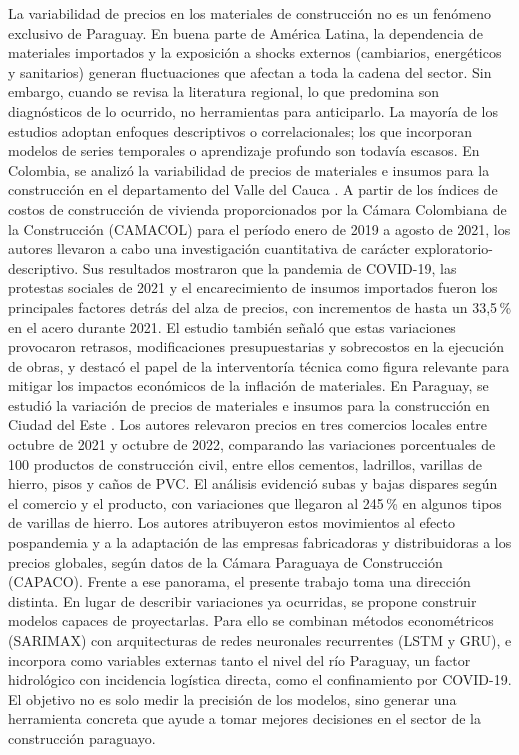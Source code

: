 \justify
La variabilidad de precios en los materiales de construcción no es un fenómeno exclusivo de Paraguay. En buena parte de América Latina, la dependencia de materiales importados y la exposición a shocks externos (cambiarios, energéticos y sanitarios) generan fluctuaciones que afectan a toda la cadena del sector. Sin embargo, cuando se revisa la literatura regional, lo que predomina son diagnósticos de lo ocurrido, no herramientas para anticiparlo. La mayoría de los estudios adoptan enfoques descriptivos o correlacionales; los que incorporan modelos de series temporales o aprendizaje profundo son todavía escasos.
\justify
En Colombia, se analizó la variabilidad de precios de materiales e insumos para la construcción en el departamento del Valle del Cauca \cite{castaneda2022}. A partir de los índices de costos de construcción de vivienda proporcionados por la Cámara Colombiana de la Construcción (CAMACOL) para el período enero de 2019 a agosto de 2021, los autores llevaron a cabo una investigación cuantitativa de carácter exploratorio-descriptivo. Sus resultados mostraron que la pandemia de COVID-19, las protestas sociales de 2021 y el encarecimiento de insumos importados fueron los principales factores detrás del alza de precios, con incrementos de hasta un 33,5\,\% en el acero durante 2021. El estudio también señaló que estas variaciones provocaron retrasos, modificaciones presupuestarias y sobrecostos en la ejecución de obras, y destacó el papel de la interventoría técnica como figura relevante para mitigar los impactos económicos de la inflación de materiales.
\justify
En Paraguay, se estudió la variación de precios de materiales e insumos para la construcción en Ciudad del Este \cite{almada2022}. Los autores relevaron precios en tres comercios locales entre octubre de 2021 y octubre de 2022, comparando las variaciones porcentuales de 100 productos de construcción civil, entre ellos cementos, ladrillos, varillas de hierro, pisos y caños de PVC. El análisis evidenció subas y bajas dispares según el comercio y el producto, con variaciones que llegaron al 245\,\% en algunos tipos de varillas de hierro. Los autores atribuyeron estos movimientos al efecto pospandemia y a la adaptación de las empresas fabricadoras y distribuidoras a los precios globales, según datos de la Cámara Paraguaya de Construcción (CAPACO).
\justify
Frente a ese panorama, el presente trabajo toma una dirección distinta. En lugar de describir variaciones ya ocurridas, se propone construir modelos capaces de proyectarlas. Para ello se combinan métodos econométricos (SARIMAX) con arquitecturas de redes neuronales recurrentes (LSTM y GRU), e incorpora como variables externas tanto el nivel del río Paraguay, un factor hidrológico con incidencia logística directa, como el confinamiento por COVID-19. El objetivo no es solo medir la precisión de los modelos, sino generar una herramienta concreta que ayude a tomar mejores decisiones en el sector de la construcción paraguayo.
